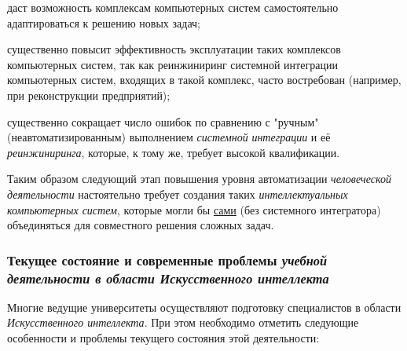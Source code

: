 \begin{textitemize}
	\item
	даст возможность комплексам компьютерных систем самостоятельно адаптироваться к решению новых задач;
	\item
	существенно повысит эффективность эксплуатации таких комплексов компьютерных систем, так как реинжиниринг системной интеграции компьютерных систем, входящих в такой комплекс, часто востребован (например, при реконструкции предприятий);
	\item
	существенно сокращает число ошибок по сравнению с "ручным"{} (неавтоматизированным) выполнением \textit{системной} \textit{интеграции} и её \textit{реинжиниринга}, которые, к тому же, требует высокой квалификации.
\end{textitemize}

Таким образом следующий этап повышения уровня автоматизации \textit{человеческой деятельности} настоятельно требует создания таких \textit{интеллектуальных компьютерных систем}, которые могли бы \underline{сами} (без системного интегратора) объединяться для совместного решения сложных задач.

\subsubsection{Текущее состояние и современные проблемы \textbf{\textit{учебной деятельности в области Искусственного интеллекта}}}

Многие ведущие университеты осуществляют подготовку специалистов в области \textit{Искусственного интеллекта}. При этом необходимо отметить следующие особенности и проблемы текущего состояния этой деятельности:

